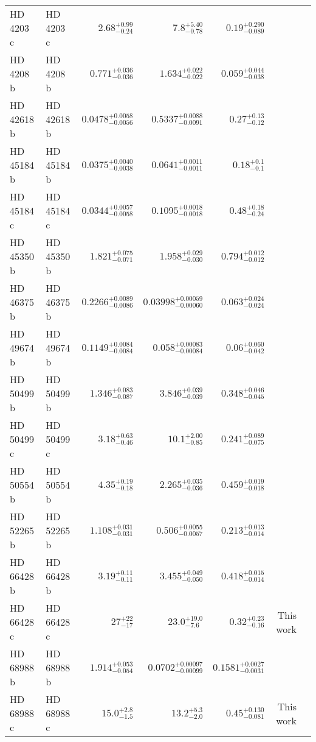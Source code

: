 \begin{longtable*}{llrrrrr}
HD 4203 c & HD 4203 c & $2.68^{+0.99}_{-0.24}$ & $7.8^{+5.40}_{-0.78}$ & $0.19^{+0.290}_{-0.089}$ & \cite{Kane14} & \\ 
HD 4208 b & HD 4208 b & $0.771^{+0.036}_{-0.036}$ & $1.634^{+0.022}_{-0.022}$ & $0.059^{+0.044}_{-0.038}$ & \cite{Vogt02} & \\ 
HD 42618 b & HD 42618 b & $0.0478^{+0.0058}_{-0.0056}$ & $0.5337^{+0.0088}_{-0.0091}$ & $0.27^{+0.13}_{-0.12}$ & \cite{Fulton16} & \\ 
HD 45184 b & HD 45184 b & $0.0375^{+0.0040}_{-0.0038}$ & $0.0641^{+0.0011}_{-0.0011}$ & $0.18^{+0.1}_{-0.1}$ & \cite{Udry19} & \\ 
HD 45184 c & HD 45184 c & $0.0344^{+0.0057}_{-0.0058}$ & $0.1095^{+0.0018}_{-0.0018}$ & $0.48^{+0.18}_{-0.24}$ & \cite{Udry19} & \\ 
HD 45350 b & HD 45350 b & $1.821^{+0.075}_{-0.071}$ & $1.958^{+0.029}_{-0.030}$ & $0.794^{+0.012}_{-0.012}$ & \cite{Marcy05} & \\ 
HD 46375 b & HD 46375 b & $0.2266^{+0.0089}_{-0.0086}$ & $0.03998^{+0.00059}_{-0.00060}$ & $0.063^{+0.024}_{-0.024}$ & \cite{Marcy00} & \\ 
HD 49674 b & HD 49674 b & $0.1149^{+0.0084}_{-0.0084}$ & $0.058^{+0.00083}_{-0.00084}$ & $0.06^{+0.060}_{-0.042}$ & \cite{Butler03} & \\ 
HD 50499 b & HD 50499 b & $1.346^{+0.083}_{-0.087}$ & $3.846^{+0.039}_{-0.039}$ & $0.348^{+0.046}_{-0.045}$ & \cite{Vogt05} & \\ 
HD 50499 c & HD 50499 c & $3.18^{+0.63}_{-0.46}$ & $10.1^{+2.00}_{-0.85}$ & $0.241^{+0.089}_{-0.075}$ & \cite{Rickman19} & \\ 
HD 50554 b & HD 50554 b & $4.35^{+0.19}_{-0.18}$ & $2.265^{+0.035}_{-0.036}$ & $0.459^{+0.019}_{-0.018}$ & \cite{Fischer02} & \\ 
HD 52265 b & HD 52265 b & $1.108^{+0.031}_{-0.031}$ & $0.506^{+0.0055}_{-0.0057}$ & $0.213^{+0.013}_{-0.014}$ & \cite{Butler00} & \\ 
HD 66428 b & HD 66428 b & $3.19^{+0.11}_{-0.11}$ & $3.455^{+0.049}_{-0.050}$ & $0.418^{+0.015}_{-0.014}$ & \cite{Butler06} & \\ 
HD 66428 c & HD 66428 c & $27^{+22}_{-17}$ & $23.0^{+19.0}_{-7.6}$ & $0.32^{+0.23}_{-0.16}$ & This work & \\ 
HD 68988 b & HD 68988 b & $1.914^{+0.053}_{-0.054}$ & $0.0702^{+0.00097}_{-0.00099}$ & $0.1581^{+0.0027}_{-0.0031}$ & \cite{Vogt02} & \\ 
HD 68988 c & HD 68988 c & $15.0^{+2.8}_{-1.5}$ & $13.2^{+5.3}_{-2.0}$ & $0.45^{+0.130}_{-0.081}$ & This work & \\ 

\end{longtable*}
